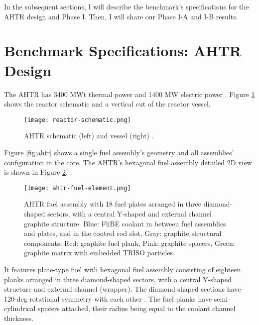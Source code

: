 In the subsequent sections, I will describe the benchmark's specifications for 
the \gls{AHTR} design and Phase I. Then, I will share our Phase I-A and I-B 
results. 

\section{Benchmark Specifications: AHTR Design}
The \acrlong{AHTR} has 3400 MWt thermal power and 1400 MW electric power 
\cite{varma_ahtr_2012}. 
Figure \ref{fig:reactor-schematic} shows the reactor schematic and a vertical 
cut of the reactor vessel. 
\begin{figure}[]
    \centering
    \texttt{[image: reactor-schematic.png]} 
    \caption{\acrlong{AHTR} schematic (left) and vessel (right) 
    \cite{noauthor_fluoride_nodate}.}
    \label{fig:reactor-schematic}
\end{figure}
Figure \ref{fig:ahtr} shows a single fuel assembly's geometry and all 
assemblies' configuration in the core.
The \gls{AHTR}'s hexagonal fuel assembly detailed 2D view is shown in 
Figure \ref{fig:ahtr-fuel-assembly}.  
\begin{figure}[]
    \centering
    \texttt{[image: ahtr-fuel-element.png]} 
    \caption{\acrlong{AHTR} fuel assembly with 18 fuel plates arranged in 
    three diamond-shaped sectors, with a central Y-shaped and external channel 
    graphite structure. Blue: FliBE coolant in between fuel assemblies and plates, 
    and in the control rod slot, Gray: graphite structural components, 
    Red: graphite fuel plank, Pink: graphite spacers, Green: graphite matrix 
    with embedded TRISO particles.}
    \label{fig:ahtr-fuel-assembly}
\end{figure}
It features plate-type fuel with hexagonal fuel assembly consisting of eighteen 
planks arranged in three diamond-shaped sectors, with a central Y-shaped 
structure and external channel (wrapper).
The diamond-shaped sections have 120-deg rotational symmetry with each other 
\cite{varma_ahtr_2012,ramey_monte_2018,noauthor_fluoride_nodate}. 
The fuel planks have semi-cylindrical spacers attached, their radius being 
equal to the coolant channel thickness. 

